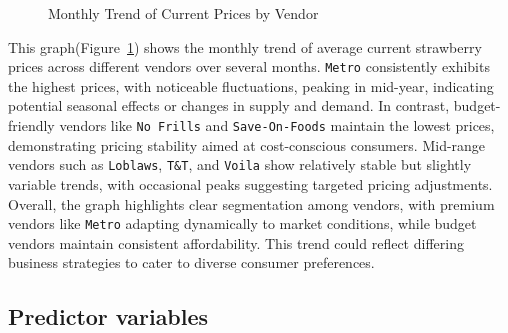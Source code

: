 \documentclass[
  letterpaper,
  DIV=11,
  numbers=noendperiod]{scrartcl}
\begin{document}
\begin{figure}


\caption{\label{fig-monthlytrend}Monthly Trend of Current Prices by
Vendor}

\end{figure}%

This graph(Figure~\ref{fig-monthlytrend}) shows the monthly trend of
average current strawberry prices across different vendors over several
months. \texttt{Metro} consistently exhibits the highest prices, with
noticeable fluctuations, peaking in mid-year, indicating potential
seasonal effects or changes in supply and demand. In contrast,
budget-friendly vendors like \texttt{No\ Frills} and
\texttt{Save-On-Foods} maintain the lowest prices, demonstrating pricing
stability aimed at cost-conscious consumers. Mid-range vendors such as
\texttt{Loblaws}, \texttt{T\&T}, and \texttt{Voila} show relatively
stable but slightly variable trends, with occasional peaks suggesting
targeted pricing adjustments. Overall, the graph highlights clear
segmentation among vendors, with premium vendors like \texttt{Metro}
adapting dynamically to market conditions, while budget vendors maintain
consistent affordability. This trend could reflect differing business
strategies to cater to diverse consumer preferences.

\subsection{Predictor variables}\label{predictor-variables}
\end{document}
